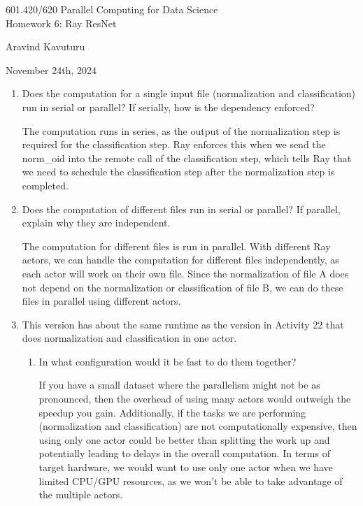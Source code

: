 \documentclass{article}
\begin{document}
\pagestyle{empty}

\begin{center}
  \begin{Large}
    601.420/620 Parallel Computing for Data Science\\
    Homework 6: Ray ResNet
  \end{Large}
\end{center}
\begin{center} Aravind Kavuturu \end{center}
\begin{center} November 24th, 2024 \end{center}
\vspace{10pt}

\begin{enumerate}
    \item Does the computation for a single input file (normalization and classification) run in serial or parallel? If serially, how is the dependency enforced?
    
    The computation runs in series, as the output of the normalization step is required for the classification step. Ray enforces this when we send the norm\_oid into the remote call of the classification step, which tells Ray that we need to schedule the classification step after the normalization step is completed.

    \item Does the computation of different files run in serial or parallel? If parallel, explain why they are independent.
    
    The computation for different files is run in parallel. With different Ray actors, we can handle the computation for different files independently, as each actor will work on their own file. Since the normalization of file A does not depend on the normalization or classification of file B, we can do these files in parallel using different actors.

    \item This version has about the same runtime as the version in Activity 22 that does normalization and classification in one actor.
    \begin{enumerate}
        \item In what configuration would it be fast to do them together?
        
        If you have a small dataset where the parallelism might not be as pronounced, then the overhead of using many actors would outweigh the speedup you gain. Additionally, if the tasks we are performing (normalization and classification) are not computationally expensive, then using only one actor could be better than splitting the work up and potentially leading to delays in the overall computation. In terms of target hardware, we would want to use only one actor when we have limited CPU/GPU resources, as we won't be able to take advantage of the multiple actors.


\end{enumerate}
\end{enumerate}
\end{document}
